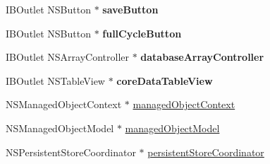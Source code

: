 \begin{DoxyCompactItemize}
\item 
\hypertarget{interface_app_delegate_a3d4646a1c7a0102140bf3b88e5e04aa1}{I\-B\-Outlet N\-S\-Button $\ast$ {\bfseries save\-Button}}\label{interface_app_delegate_a3d4646a1c7a0102140bf3b88e5e04aa1}

\item 
\hypertarget{interface_app_delegate_a62d2d5f9f057a992e43f73888645a4a4}{I\-B\-Outlet N\-S\-Button $\ast$ {\bfseries full\-Cycle\-Button}}\label{interface_app_delegate_a62d2d5f9f057a992e43f73888645a4a4}

\item 
\hypertarget{interface_app_delegate_a02f8fdc36841df90db9175689a93b71d}{I\-B\-Outlet N\-S\-Array\-Controller $\ast$ {\bfseries database\-Array\-Controller}}\label{interface_app_delegate_a02f8fdc36841df90db9175689a93b71d}

\item 
\hypertarget{interface_app_delegate_a3b9772fa107d49a973ac0160ae73a350}{I\-B\-Outlet N\-S\-Table\-View $\ast$ {\bfseries core\-Data\-Table\-View}}\label{interface_app_delegate_a3b9772fa107d49a973ac0160ae73a350}

\item 
N\-S\-Managed\-Object\-Context $\ast$ \hyperlink{interface_app_delegate_a1fa650ded1ca9bb0eecda69d1f41cc1f}{managed\-Object\-Context}
\item 
N\-S\-Managed\-Object\-Model $\ast$ \hyperlink{interface_app_delegate_a9f3cb4e87e96ee48a07e2b72cf3f6d13}{managed\-Object\-Model}
\item 
N\-S\-Persistent\-Store\-Coordinator $\ast$ \hyperlink{interface_app_delegate_a4169fdb1085cc13479280e10d44c039a}{persistent\-Store\-Coordinator}
\end{DoxyCompactItemize}


